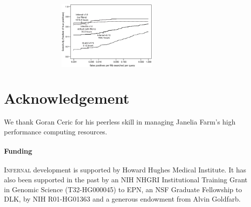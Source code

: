 \documentclass{bioinfo}
\begin{document}
\begin{application}
\begin{figure}[!tpb]
\centerline{\includegraphics[width=3.5in,height=1.33in]{figs/roc}}

\label{Fig:01}
\end{figure}

\section*{Acknowledgement}

We thank Goran Ceric for his peerless skill in managing Janelia Farm's
high performance computing resources.

\paragraph{Funding\textcolon} 
\textsc{Infernal} development is supported by Howard Hughes Medical
Institute. It has also been supported in the past by an NIH NHGRI
Institutional Training Grant in Genomic Science (T32-HG000045) to EPN,
an NSF Graduate Fellowship to DLK, by NIH R01-HG01363 and a
generous endowment from Alvin Goldfarb. 

%
%

%


\end{application}
\end{document}
